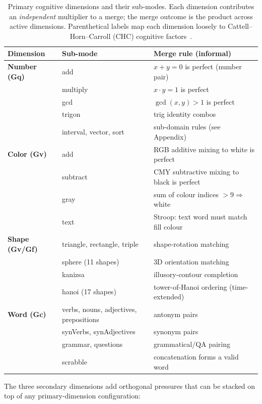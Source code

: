\documentclass[11pt]{article}
\begin{document}
\begin{table}[h]
\centering
\small
\begin{tabular}{@{}lll@{}}
\toprule
\textbf{Dimension} & \textbf{Sub-mode} & \textbf{Merge rule (informal)} \\
\midrule
\textbf{Number (Gq)} & add & $x + y = 0$ is perfect (number pair) \\
 & multiply & $x \cdot y = 1$ is perfect \\
 & gcd & $\gcd(x, y) > 1$ is perfect \\
 & trigon & trig identity combos \\
 & interval, vector, sort & sub-domain rules (see Appendix) \\
\midrule
\textbf{Color (Gv)} & add & RGB additive mixing to white is perfect \\
 & subtract & CMY subtractive mixing to black is perfect \\
 & gray & sum of colour indices $>9 \Rightarrow$ white \\
 & text & Stroop: text word must match fill colour \\
\midrule
\textbf{Shape (Gv/Gf)} & triangle, rectangle, triple & shape-rotation matching \\
 & sphere (11 shapes) & 3D orientation matching \\
 & kanizsa & illusory-contour completion \\
 & hanoi (17 shapes) & tower-of-Hanoi ordering (time-extended) \\
\midrule
\textbf{Word (Gc)} & verbs, nouns, adjectives, prepositions & antonym pairs \\
 & synVerbs, synAdjectives & synonym pairs \\
 & grammar, questions & grammatical/QA pairing \\
 & scrabble & concatenation forms a valid word \\
\bottomrule
\end{tabular}
\caption{Primary cognitive dimensions and their sub-modes. Each dimension
contributes an \emph{independent} multiplier to a merge; the merge outcome
is the product across active dimensions. Parenthetical labels map each
dimension loosely to Cattell--Horn--Carroll (CHC) cognitive
factors~\citep{reddy2025chcllm}.}
\label{tab:dimensions}
\end{table}

The three secondary dimensions add orthogonal pressures that can be stacked
on top of any primary-dimension configuration:
\end{document}
